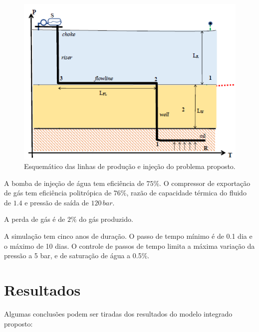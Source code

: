 \documentclass[final,5p]{elsarticle}
\numberwithin{equation}{section}
\begin{document}
        \begin{figure}
            \centering
            \includegraphics[width=0.9\linewidth]{flow_problem.png}
            \caption{Esquemático das linhas de produção e injeção do problema proposto.}
            \label{fig:desenhoflow}
        \end{figure}

        A bomba de injeção de água tem eficiência de $75\%$. O compressor de exportação de gás tem eficiência politrópica de $76\%$, razão de capacidade térmica do fluido de $1.4$ e pressão de saída de $120\,bar$.

        A perda de gás é de $2\%$ do gás produzido.

        A simulação tem cinco anos de duração. O passo de tempo mínimo é de 0.1 dia e o máximo de 10 dias. O controle de passos de tempo limita a máxima variação da pressão a 5 bar, e de saturação de água a 0.5\%.

    \section{Resultados}

        Algumas conclusões podem ser tiradas dos resultados do modelo integrado proposto:
\end{document}

